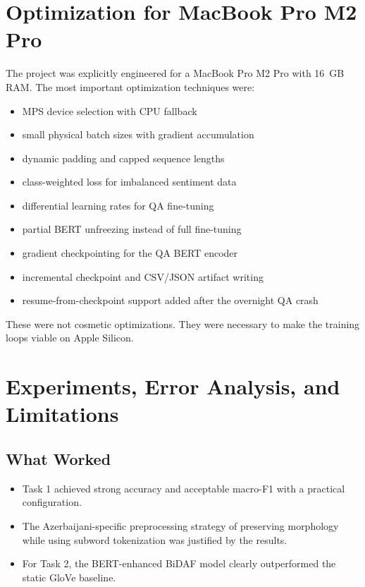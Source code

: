 \documentclass[11pt]{article}
\begin{document}
\section{Optimization for MacBook Pro M2 Pro}
The project was explicitly engineered for a MacBook Pro M2 Pro with 16~GB RAM. The most important optimization techniques were:
\begin{itemize}
    \item MPS device selection with CPU fallback
    \item small physical batch sizes with gradient accumulation
    \item dynamic padding and capped sequence lengths
    \item class-weighted loss for imbalanced sentiment data
    \item differential learning rates for QA fine-tuning
    \item partial BERT unfreezing instead of full fine-tuning
    \item gradient checkpointing for the QA BERT encoder
    \item incremental checkpoint and CSV/JSON artifact writing
    \item resume-from-checkpoint support added after the overnight QA crash
\end{itemize}

These were not cosmetic optimizations. They were necessary to make the training loops viable on Apple Silicon.

\section{Experiments, Error Analysis, and Limitations}
\subsection{What Worked}
\begin{itemize}
    \item Task 1 achieved strong accuracy and acceptable macro-F1 with a practical configuration.
    \item The Azerbaijani-specific preprocessing strategy of preserving morphology while using subword tokenization was justified by the results.
    \item For Task 2, the BERT-enhanced BiDAF model clearly outperformed the static GloVe baseline.
\end{itemize}
\end{document}
